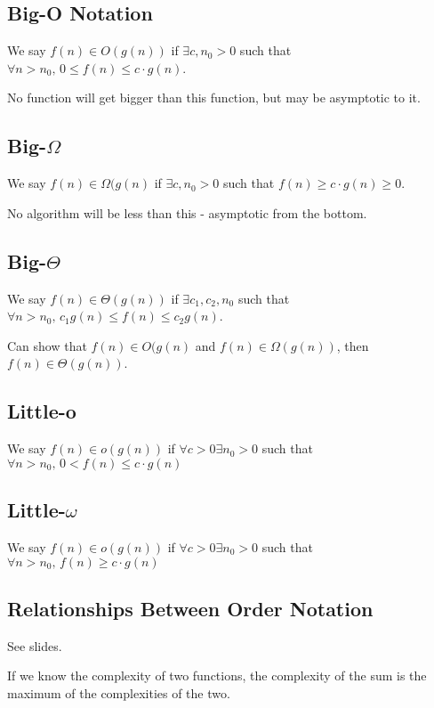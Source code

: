 \documentclass[12pt]{article}
\begin{document}
\subsection{Big-O Notation}

We say $f(n) \in O(g(n))$ if $ \exists c,n_0 > 0 $ such that $\forall n > n_0,\, 0
\leq f(n) \leq c \cdot g(n)$.

No function will get bigger than this function, but may be asymptotic to it.

\subsection{Big-$\Omega$}

We say $f(n) \in \Omega(g(n)$ if $\exists c, n_0 > 0$ such that $f(n) \ge c \cdot
g(n) \ge 0$.

No algorithm will be less than this - asymptotic from the bottom.

\subsection{Big-$\Theta$}

We say $f(n) \in \Theta(g(n))$ if $\exists c_1, c_2, n_0$ such that $\forall n >
n_0, \, c_1 g(n) \leq f(n) \leq c_2 g(n)$.

Can show that $f(n) \in O(g(n)$ and $f(n) \in \Omega(g(n))$, then $f(n) \in
\Theta(g(n))$.

\subsection{Little-o}

We say $f(n) \in o(g(n))$ if $\forall c > 0 \exists n_0 > 0$ such that $\forall
n > n_0,\, 0 < f(n) \leq c \cdot g(n)$

\subsection{Little-$\omega$}

We say $f(n) \in o(g(n))$ if $\forall c > 0 \exists n_0 > 0$ such that $\forall
n > n_0,\,  f(n) \geq c \cdot g(n)$

\subsection{Relationships Between Order Notation}

See slides.

If we know the complexity of two functions, the complexity of the sum is the
maximum of the complexities of the two.
\end{document}

